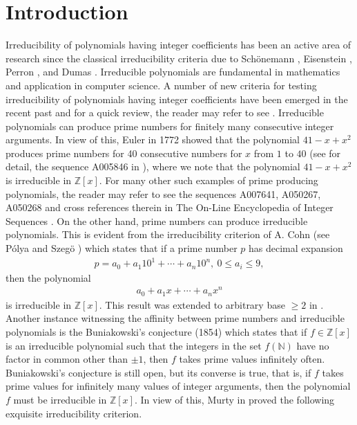 \documentclass[12pt,reqno]{amsart}%
\begin{document}
\section{Introduction}
Irreducibility of polynomials having integer coefficients has been an active area of research since the classical irreducibility criteria due to Sch\"onemann \cite{S}, Eisenstein \cite{E}, Perron \cite{P}, and Dumas \cite{Du}. Irreducible polynomials are fundamental in mathematics and application in computer science. A number of new criteria for testing irreducibility of  polynomials having integer coefficients have been emerged in the recent past and for a quick review, the reader may refer to see \cite{SKJS2023}. Irreducible polynomials can produce prime numbers for finitely many consecutive integer arguments. In view of this, Euler \cite{Euler} in 1772 showed that the polynomial $41-x+x^2$ produces  prime numbers for 40 consecutive numbers for $x$ from $1$ to $40$ (see for detail, the sequence A005846 in \cite{NJASloane}), where we note that the polynomial $41-x+x^2$ is irreducible in $\mathbb{Z}[x]$.  For many other such examples of prime producing polynomials, the reader may refer to see the sequences A007641, A050267, A050268 and cross references therein in The On-Line Encyclopedia of Integer Sequences \cite{NJASloane}.
On the other hand, prime numbers can produce irreducible polynomials. This is evident from the irreducibility criterion of A. Cohn (see P\'olya and Szeg\"o \cite[p.~113]{Polya}) which states that if  a prime number $p$ has decimal expansion
\begin{eqnarray*}
p=a_0+a_1 10^1+\cdots+a_n 10^n,~0\leq a_i\leq 9,
\end{eqnarray*}
then the polynomial
\begin{eqnarray*}
a_0+a_1 x+\cdots+a_n x^n
\end{eqnarray*}
is irreducible in $\mathbb{Z}[x]$. This result was extended to arbitrary base $\geq 2$ in \cite{Brillhart,Bonciocat4}. Another instance witnessing the affinity between prime numbers and irreducible polynomials is the Buniakowski's conjecture (1854) which states that if $f\in \mathbb Z[x]$ is an irreducible polynomial such that the integers in the set $f (\mathbb N)$ have no factor in common other than $\pm 1$, then $f$ takes prime values infinitely often. Buniakowski's conjecture is still open, but its converse is true, that is, if $f$ takes prime values for infinitely many values of integer arguments, then the polynomial $f$ must be irreducible in $\mathbb{Z}[x]$. In view of this, Murty in \cite{Mu} proved the following  exquisite irreducibility criterion.
\end{document}
